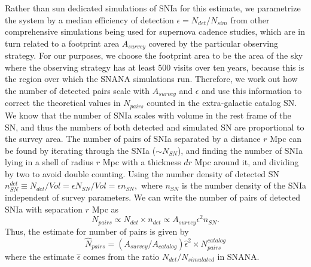 Rather than sun dedicated simulations of SNIa for this estimate, we parametrize the system by a median efficiency of detection $\epsilon = N_{det}/N_{sim}$ from other comprehensive simulations being used for supernova cadence studies, which are in turn related to a footprint area $A_{survey}$ covered by the particular observing strategy. For our purposes, we choose the footprint area to be the area of the sky where the observing strategy has at least $500$ visits over ten years, because this is the region over which the SNANA simulations run.
Therefore, we work out how the number of detected pairs scale with $A_{survey}$ and $\epsilon$ and use this information to correct the theoretical values in $N_{pairs}$ counted in the extra-galactic catalog SN. We know that the number of SNIa scales with volume in the rest frame of the SN, and thus the numbers of both detected and simulated SN are proportional to the survey area. The number of pairs of SNIa separated by a distance $r$ Mpc can be found by iterating through the SNIa ($\sim N_{SN}$), and finding the number of SNIa lying in a shell of radius $r$ Mpc with a thickness $dr$ Mpc around it, and dividing by two to avoid double counting. Using the number density of detected SN $n^{det}_{SN} \equiv N_{det}/Vol = \epsilon N_{SN}/Vol = \epsilon n_{SN},$ where $n_{SN}$ is the number density of the SNIa independent of survey parameters. We can write the number of pairs of detected SNIa with separation $r$ Mpc as 
    $$
    N_{pairs} \propto N_{det} \times {n_{det}} \propto A_{survey} \epsilon^2 {n_{SN}}.
    $$
Thus, the estimate for number of pairs is given by
$$
    \hat{N}_{pairs} = \left( A_{survey} / A_{catalog} \right)\hat{\epsilon}^2 \times N_{pairs}^{catalog}
    $$
where the estimate $\hat{\epsilon}$ comes from the ratio $N_{det}/ N_{simulated}$ in SNANA. 

